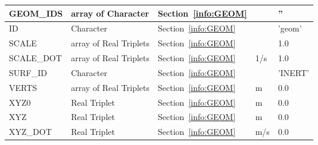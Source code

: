 \documentclass[12pt]{article}
\begin{document}
\begin{longtable}{@{\extracolsep{\fill}}|l|l|l|l|l|}
{\ct GEOM\_IDS}    & array of Character & Section~\ref{info:GEOM}                &           &   {\ct ''}               \\ \hline
{\ct ID}           & Character              & Section~\ref{info:GEOM}            &           &   {\ct 'geom'}           \\ \hline
{\ct SCALE}        & array of Real Triplets & Section~\ref{info:GEOM}            &           &   1.0                    \\ \hline
{\ct SCALE\_DOT}   & array of Real Triplets & Section~\ref{info:GEOM}            &  1/s      &   1.0                    \\ \hline
{\ct SURF\_ID}     & Character              & Section~\ref{info:GEOM}            &           &  {\ct 'INERT'}           \\ \hline
{\ct VERTS}        & array of Real Triplets & Section~\ref{info:GEOM}            &   m       &   0.0                    \\ \hline
{\ct XYZ0}         & Real Triplet           & Section~\ref{info:GEOM}            &   m       &   0.0                    \\ \hline
{\ct XYZ}          & Real Triplet           & Section~\ref{info:GEOM}            &   m       &   0.0                    \\ \hline
{\ct XYZ\_DOT}     & Real Triplet           & Section~\ref{info:GEOM}            &   m/s     &   0.0                    \\ \hline

\end{longtable}


\vspace{\baselineskip}
\end{document}
